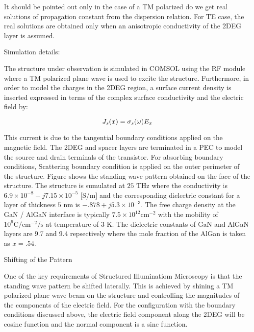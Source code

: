 \documentclass[11pt]{article}
\begin{document}
\begin{equation}
  \label{eq: dispersion}
\end{equation}

It should be pointed out only in the case of a TM polarized do we get real solutions of propagation constant from the dispersion relation. For TE case, the real solutions are obtained only when an anisotropic conductivity of the 2DEG layer is assumed.

Simulation details:

The structure under observation is simulated in COMSOL using the RF module where a TM polarized plane wave is used to excite the structure. Furthermore, in order to model the charges in the 2DEG region, a surface current density is inserted expressed in terms of the complex surface conductivity and the electric field by:

\begin{equation}
  J_s (x) = \sigma_s(\omega) E_x
  \label{eq:Js}
\end{equation}

This current is due to the tangential boundary conditions applied on the magnetic field. The 2DEG and spacer layers are terminated in a PEC to model the source and drain terminals of the transistor. For absorbing boundary conditions, Scattering boundary condition is applied on the outer perimeter of the structure. Figure shows the standing wave pattern obtained on the face of the structure. The structure is sumulated at $25$ THz where the conductivity is $6.9 \times 10^{-8} + j 7.15 \times 10^{-5}$ [S/m]  and the corresponding dielectric constant for a layer of thickness $5$ nm is $-.878 + j 5.3 \times 10^{-3}$. The free charge density at the GaN / AlGaN interface is typically $7.5 \times 10 ^{12} \mathrm{cm}^{-2}$ with the mobility of $10^{6} \mathrm{C/cm^{-2}/s}$ at temperature of $3$ K. The dielectric constants of GaN and AlGaN layers are 9.7 and 9.4 repsectively where the mole fraction of the AlGan is taken as $x = .54$.

Shifting of the Pattern

One of the key requirements of Structured Illuminatiom Microscopy is that the standing wave pattern be shifted laterally. This is achieved by shining a TM polarized plane wave beam on the structure and controlling the magnitudes of the components of the electric field. For the configuration with the boundary conditions discussed above, the electric field component along the 2DEG will be cosine function and the normal component is a sine function.
\end{document}
